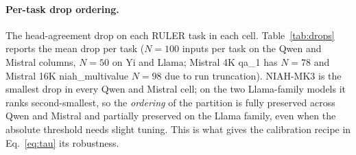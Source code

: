 \documentclass{article}
\begin{document}
\paragraph{Per-task drop ordering.}
\label{subsec:drops-ordering}
The head-agreement drop on each RULER task in each cell.
Table~\ref{tab:drops} reports the mean drop per task ($N = 100$ inputs
per task on the Qwen and Mistral columns, $N = 50$ on Yi and Llama;
Mistral 4K qa\_1 has $N = 78$ and Mistral 16K niah\_multivalue $N = 98$
due to run truncation). NIAH-MK3 is the smallest drop in every Qwen and
Mistral cell; on the two Llama-family models it ranks second-smallest,
so the \emph{ordering} of the partition is fully preserved across Qwen
and Mistral and partially preserved on the Llama family, even when the
absolute threshold needs slight tuning. This is
what gives the calibration recipe in Eq.~\eqref{eq:tau} its robustness.

\begin{table}[h]
\centering
\caption{Per-task mean head-agreement drop $D$ across three
architecture families (Qwen, Mistral, and the Llama family: Yi-1.5 and
Llama-3.1). Layer bins are early $= [0, \lfloor L/3 \rfloor)$ and late
$= [\lfloor 2L/3 \rfloor, L)$ throughout. Bold marks the smallest drop
per column. NIAH-MK3 is
the smallest drop on Qwen and Mistral cells; on Yi-1.5 and Llama-3.1
it ranks 2nd-smallest behind niah\_multivalue (Llama-arch family
artifact; see prose). Yi-1.5-9B
serves as a parallel Llama-class architecture with a distinct training
corpus (different tokenizer, deeper layer geometry).}
\label{tab:drops}
\end{table}
\end{document}

